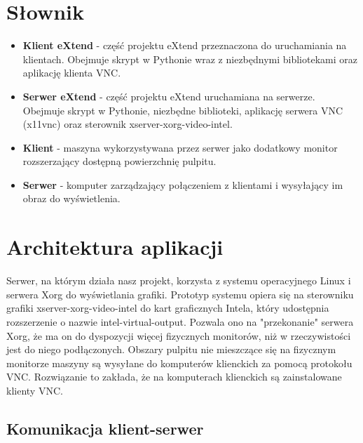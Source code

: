 


\maketitle

\tableofcontents
\vfill
\pagebreak

\section{Słownik}

  \begin{itemize}
    \item \textbf{Klient eXtend} - część projektu eXtend przeznaczona do uruchamiania na klientach. Obejmuje skrypt w Pythonie wraz z niezbędnymi bibliotekami oraz aplikację klienta VNC.
    \item \textbf{Serwer eXtend} - część projektu eXtend uruchamiana na serwerze. Obejmuje skrypt w Pythonie, niezbędne biblioteki, aplikację serwera VNC (x11vnc) oraz sterownik xserver-xorg-video-intel.
    \item \textbf{Klient} - maszyna wykorzystywana przez serwer jako dodatkowy monitor rozszerzający dostępną powierzchnię pulpitu.
    \item \textbf{Serwer} - komputer zarządzający połączeniem z klientami i wysyłający im obraz do wyświetlenia.
  \end{itemize}

\section{Architektura aplikacji}


  Serwer, na którym działa nasz projekt, korzysta z systemu operacyjnego Linux i serwera Xorg do wyświetlania grafiki. Prototyp systemu opiera się na sterowniku grafiki xserver-xorg-video-intel do kart graficznych Intela, który udostępnia rozszerzenie o nazwie intel-virtual-output. Pozwala ono na "przekonanie" serwera Xorg, że ma on do dyspozycji więcej fizycznych monitorów, niż w rzeczywistości jest do niego podłączonych. Obszary pulpitu nie mieszczące się na fizycznym monitorze maszyny są wysyłane do komputerów klienckich za pomocą protokołu VNC. Rozwiązanie to zakłada, że na komputerach klienckich są zainstalowane klienty VNC.

  \subsection{Komunikacja klient-serwer}

